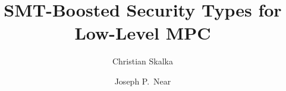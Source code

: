 
\title{SMT-Boosted Security Types for Low-Level MPC}

\author{
Christian Skalka
\and
Joseph P.~Near}


\newcommand{\theabstract}{
  \begin{abstract}
  Secure Multi-Party Computation (MPC) is an important enabling
  technology for data privacy in modern distributed applications. We
  develop a new type theory to automatically enforce correctness,
  confidentiality, and integrity properties of protocols written in
  the \emph{Prelude/Overture} language framework. Judgements in the
  type theory are predicated on SMT verifications in a theory of
  finite fields, which supports precise and efficient analysis. Our
  approach is automated, compositional, scalable, and generalizes to arbitrary
  prime fields for data and key sizes.
\end{abstract} }
